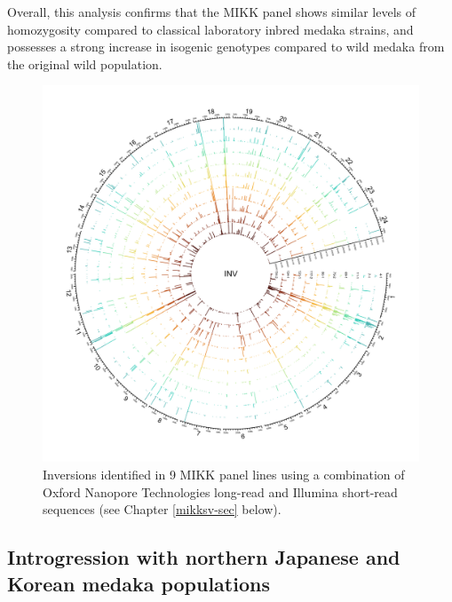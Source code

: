 \documentclass[
]{book}
\begin{document}
Overall, this analysis confirms that the MIKK panel shows similar levels of homozygosity compared to classical laboratory inbred medaka strains, and possesses a strong increase in isogenic genotypes compared to wild medaka from the original wild population.



\begin{figure}
\includegraphics[width=1\linewidth]{figs/mikk_genome/20210224_sv_invs_lines} \caption{Inversions identified in 9 MIKK panel lines using a combination of Oxford Nanopore Technologies long-read and Illumina short-read sequences (see Chapter \ref{mikksv-sec} below).}\label{fig:SVInvs}
\end{figure}

\hypertarget{introgression-sec}{%
\subsection{Introgression with northern Japanese and Korean medaka populations}\label{introgression-sec}}
\end{document}

